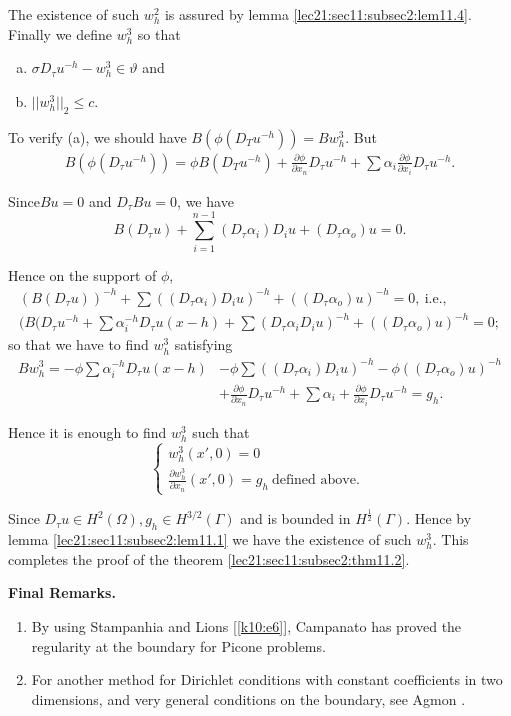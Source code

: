 The existence of such $w^2_h$ is assured by lemma \ref{lec21:sec11:subsec2:lem11.4}. Finally we
define $w^3_h$ so that 
\begin{enumerate}[a)]
\item $\sigma D_\tau u^{-h} - w^3_h \in \vartheta$
and 
\item $|| w^3_h ||_2 \leq c$. 
\end{enumerate}

To verify (a), we should have $B(\phi (D_T u^{-h})) = Bw^3_h$. But
\begin{gather*}
B(\phi (D_\tau u^{-h})) = \phi B(D_T u^{-h}) + \frac{\partial
  \phi}{\partial x_n} D_\tau u^{-h} + \sum \alpha_i \frac{\partial
  \phi}{\partial x_i} D_\tau u^{-h}. 
\end{gather*}

Since\pageoriginale $Bu = 0$ and $D_\tau B u = 0$, we have
$$
B(D_\tau u) + \sum_{i=1}^{n-1} (D_\tau \alpha_i ) D_i u + (D_\tau \alpha_o ) u =0. 
$$

Hence on the support of $\phi$, 
\begin{gather*}
(B(D_\tau u))^{-h} + \sum ((D_\tau \alpha_i) D_i u)^{-h} + ((D_\tau
  \alpha_o) u)^{-h} = 0, ~\text{i.e.,} \\ 
(B(D_\tau u^{-h} + \sum \alpha_i^{-h} D_\tau u(x-h) + \sum (D_\tau
  \alpha_i D_i u)^{-h} + ((D_\tau \alpha_o) u)^{-h} = 0; 
\end{gather*}
so that we have to find $w^3_h$ satisfying
\begin{align*}
B w^3_h = - \phi \sum \alpha_i^{-h} D_\tau u(x-h) & - \phi \sum
((D_\tau \alpha_i) D_i u)^{-h} - \phi ((D_\tau \alpha_o ) u)^{-h}\\ 
& + \frac{\partial \phi}{\partial x_n} D_\tau u^{-h} + \sum \alpha_i +
\frac{\partial \phi}{\partial x_i} D_\tau u^{-h} = g_h.  
\end{align*}

Hence it is enough to find $w^3_h$ such that
$$
\begin{cases}
w^3_h (x', 0) = 0\\
\frac{\partial w^3_h}{\partial x_n}(x', 0 ) = g_h ~ \text{defined above. }
\end{cases}
$$

Since $D_\tau u \in H^2 (\Omega), g_h \in H^{3/2}
(\Gamma)$ and is bounded in $H^{\frac{1}{2}} (\Gamma)$. Hence by lemma
\ref{lec21:sec11:subsec2:lem11.1} we have the existence of such $w^3_h$. This completes the
proof of the theorem \ref{lec21:sec11:subsec2:thm11.2}.  

\medskip
\noindent\textbf {Final Remarks. } 
~
\begin{enumerate} [(1)]
\item By using Stampanhia \cite{k17} and Lions [\ref{k10:e6}], Campanato \cite{k6} has
  proved the regularity at the boundary for Picone problems.  
\item For another method for Dirichlet conditions with constant
  coefficients in two dimensions, and very general conditions on the
  boundary, see Agmon \cite{k1}.  
\end{enumerate}
